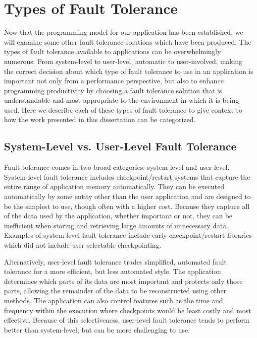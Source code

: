\section{Types of Fault Tolerance}
\label{sec:background:types}

Now that the programming model for our application has been established, we will 
examine some other fault tolerance solutions which have been produced. The types of 
fault tolerance available to applications can be overwhelmingly
numerous. From system-level to user-level, automatic to user-involved, making
the correct decision about which type of fault tolerance to use in an
application is important not only from a performance perspective, but also to
enhance programming productivity by choosing a fault tolerance solution that is
understandable and most appropriate to the environment in which it is being
used. Here we describe each of these types of fault tolerance to give context to 
how the work presented in this dissertation can be categorized.

\subsection{System-Level vs. User-Level Fault Tolerance}
\label{subsec:background:types:system-user}

Fault tolerance comes in two broad categories: system-level and user-level. 
System-level fault tolerance includes checkpoint/restart systems that 
capture the entire range of application memory automatically. They can be executed 
automatically by some entity other than the user application and are designed to be the 
simplest to use, though often with a higher cost. Because they capture all of 
the data used by the application, whether important or not, they can be 
inefficient when storing and retrieving large amounts of unnecessary data. 
Examples of system-level fault tolerance include early checkpoint/restart 
libraries which did not include user selectable checkpointing.

Alternatively, user-level fault tolerance trades simplified, automated fault 
tolerance for a more efficient, but less automated style. The application 
determines which parts of its data are most important and protects only those 
parts, allowing the remainder of the data to be reconstructed using other 
methods. The application can also control features such as the time and 
frequency within the execution where checkpoints would be least costly and 
most effective. Because of this selectiveness, user-level fault tolerance tends 
to perform better than system-level, but can be more challenging to use.


